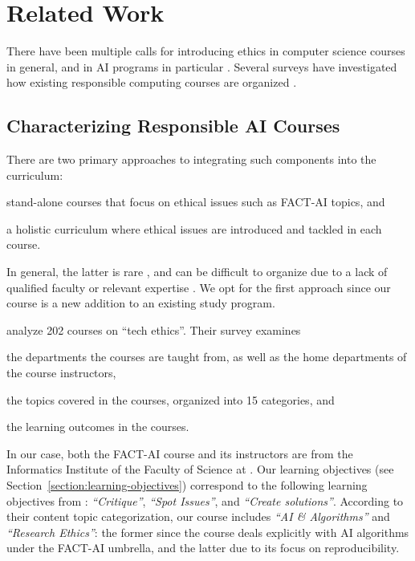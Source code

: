 
\section{Related Work}
\label{section:fact-related-work}

There have been multiple calls for introducing ethics in computer science courses in general, and in AI programs in particular \citep{leonelli2016locating, o2017ivory, singer2018tech, skirpan2018ethics, grosz2019embedded, salz2019integrating, danyluk2021computing}. 
Several surveys have investigated how existing responsible computing courses are organized \citep{peck2017,fiesler2020we, garret2020morethan, raji_you_2021}. 

\subsection{Characterizing Responsible AI Courses}
There are two primary approaches to integrating such components into the curriculum: 
\begin{enumerate*}[label=(\roman*)]
\item stand-alone courses that focus on ethical issues such as FACT-AI topics, and 
\item a holistic curriculum where ethical issues are introduced and tackled in each course. 
\end{enumerate*}
In general, the latter is rare \citep{peck2017, salz2019integrating, fiesler2020we}, and can be difficult to organize due to a lack of qualified faculty or relevant expertise \citep{bates2020integrating, raji_you_2021}. 
We opt for the first approach since our course is a new addition to an existing study program. 

\citet{fiesler2020we} analyze 202 courses on ``tech ethics''. 
Their survey examines 
\begin{enumerate*}[label=(\roman*)]
\item the departments the courses are taught from, as well as the home departments of the course instructors, 
\item the topics covered in the courses, organized into 15 categories, and 
\item the learning outcomes in the courses. 
\end{enumerate*}
In our case, both the FACT-AI course and its instructors are from the Informatics Institute of the Faculty of Science at \OurUniversity{}. Our learning objectives (see Section~\ref{section:learning-objectives}) correspond to the following learning objectives from \citet{fiesler2020we}: \textit{``Critique''}, \textit{``Spot Issues''}, and \textit{``Create solutions''}. 
According to their content topic categorization, our course includes \textit{``AI \& Algorithms''} and \textit{``Research Ethics''}: the former since the course deals explicitly with AI algorithms under the FACT-AI umbrella, and the latter due to its focus on reproducibility. 

